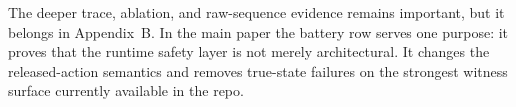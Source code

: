 The deeper trace, ablation, and raw-sequence evidence remains important, but it belongs
in Appendix~B. In the main paper the battery row serves one purpose: it proves that the
runtime safety layer is not merely architectural. It changes the released-action
semantics and removes true-state failures on the strongest witness surface currently
available in the repo.
